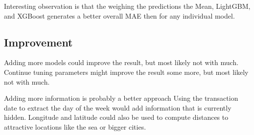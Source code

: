 \documentclass[a4paper]{article}
\begin{document}
Interesting observation is that the weighing the predictions the Mean, LightGBM, and XGBoost generates a better overall MAE then for any individual model.




\subsection{Improvement}
Adding more models could improve the result, but most likely not with much. Continue tuning parameters might improve the result some more, but most likely not with much.

Adding more information is probably a better approach Using the transaction date to extract the day of the week would add information that is currently hidden. Longitude and latitude could also be used to compute distances to attractive locations like the sea or bigger cities.
\end{document}
